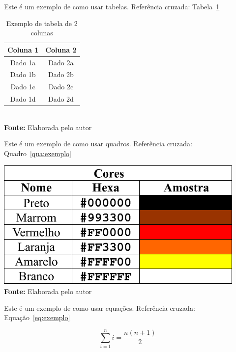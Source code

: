 \documentclass[
	article,			%
	11pt,				%
	oneside,			%
	a4paper,			%
	chapter=TITLE,		%
	section=TITLE,		%
	english,			%
	brazil,				%
	sumario=tradicional
]{abntex2}
\begin{document}
     
     Este é um exemplo de como usar tabelas. Referência cruzada: Tabela~\ref{tab:exemplo}
     
     \FloatBarrier
     \begin{table}[!htbp]
     	\centering
     	\caption{Exemplo de tabela de 2 colunas}
     	\begin{tabular}{ c | c }
     		\hline
     		\textbf{Coluna 1} & \textbf{Coluna 2} \\ \hline
     		Dado 1a           & Dado 2a           \\ \hline
     		Dado 1b           & Dado 2b           \\ \hline
     		Dado 1c           & Dado 2c           \\ \hline
     		Dado 1d           & Dado 2d           \\ \hline
     	\end{tabular}
     	\\ \vspace{0.2cm}
     	\textbf{Fonte:} Elaborada pelo autor
     	\label{tab:exemplo}
     \end{table}
     \FloatBarrier
     
     
     Este é um exemplo de como usar quadros. Referência cruzada: Quadro~\ref{qua:exemplo}
     
     \FloatBarrier
     \begin{quadro}[!htbp]
     	\centering
     	\caption{Exemplo de quadro}
     	\includegraphics[scale=.7]{imagens/exemploQuadro}
     	\\\textbf{Fonte:} Elaborada pelo autor
     	\label{qua:exemplo}
     \end{quadro}
     \FloatBarrier
     
     
     Este é um exemplo de como usar equações. Referência cruzada: Equação~\ref{eq:exemplo}
     
     \begin{equation}
     \sum_{i=1}^{n} i = \frac{n(n+1)}{2}
     \label{eq:exemplo}
     \end{equation}
     
\end{document}
